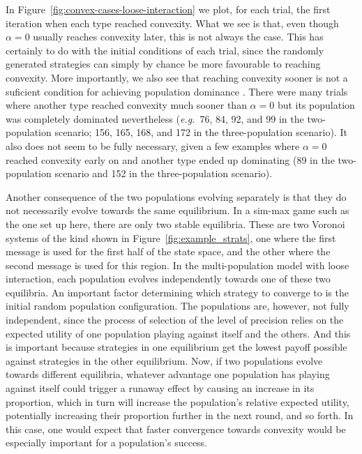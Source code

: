 \documentclass[a4paper]{article}
\begin{document}
In Figure~\ref{fig:convex-cases-loose-interaction} we plot, for each trial, the first iteration when each type reached convexity.
What we see is that, even though $\alpha = 0$ usually reaches convexity later, this is not always the case.
This has certainly to do with the initial conditions of each trial, since the randomly generated strategies can simply by chance be more favourable to reaching convexity.
More importantly, we also see that reaching convexity sooner is not a suficient condition for achieving population dominance .
There were many trials where another type reached convexity much sooner than $\alpha = 0$ but its population was completely dominated nevertheless (\emph{e.g.}~76, 84, 92, and 99 in the two-population scenario; 156, 165, 168, and 172 in the three-population scenario).
It also does not seem to be fully necessary, given a few examples where $\alpha = 0$ reached convexity early on and another type ended up dominating (89 in the two-population scenario and 152 in the three-population scenario).

Another consequence of the two populations evolving separately is that they do not necessarily evolve towards the same equilibrium.
In a sim-max game such as the one set up here, there are only two stable equilibria.
These are two Voronoi systems of the kind shown in Figure~\ref{fig:example_strats}, one where the first message is used for the first half of the state space, and the other where the second message is used for this region.
In the multi-population model with loose interaction, each population evolves independently towards one of these two equilibria.
An important factor determining which strategy to converge to is the initial random population configuration.
The populations are, however, not fully independent, since the process of selection of the level of precision relies on the expected utility of one population playing against itself and the others.
And this is important because strategies in one equilibrium get the lowest payoff possible against strategies in the other equilibrium.
Now, if two populations evolve towards different equilibria, whatever advantage one population has playing against itself could trigger a runaway effect by causing an increase in its proportion, which in turn will increase the population's relative expected utility, potentially increasing their proportion further in the next round, and so forth.
In this case, one would expect that faster convergence towards convexity would be especially important for a population's success.
\end{document}
